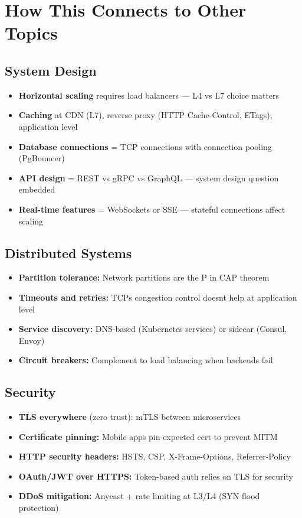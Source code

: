 \documentclass[11pt]{article}
\providecommand{\tightlist}{\setlength{\itemsep}{1pt}\setlength{\parskip}{0pt}}
\begin{document}
\section{How This Connects to Other Topics}\label{how-this-connects-to-other-topics}

\subsection{System Design}\label{system-design}

\begin{itemize}
\tightlist
\item
  \textbf{Horizontal scaling} requires load balancers --- L4 vs L7 choice matters
\item
  \textbf{Caching} at CDN (L7), reverse proxy (HTTP Cache-Control, ETags), application level
\item
  \textbf{Database connections} = TCP connections with connection pooling (PgBouncer)
\item
  \textbf{API design} = REST vs gRPC vs GraphQL --- system design question embedded
\item
  \textbf{Real-time features} = WebSockets or SSE --- stateful connections affect scaling
\end{itemize}

\subsection{Distributed Systems}\label{distributed-systems}

\begin{itemize}
\tightlist
\item
  \textbf{Partition tolerance:} Network partitions are the P in CAP theorem
\item
  \textbf{Timeouts and retries:} TCP\textquotesingle s congestion control doesn\textquotesingle t help at application level
\item
  \textbf{Service discovery:} DNS-based (Kubernetes services) or sidecar (Consul, Envoy)
\item
  \textbf{Circuit breakers:} Complement to load balancing when backends fail
\end{itemize}

\subsection{Security}\label{security}

\begin{itemize}
\tightlist
\item
  \textbf{TLS everywhere} (zero trust): mTLS between microservices
\item
  \textbf{Certificate pinning:} Mobile apps pin expected cert to prevent MITM
\item
  \textbf{HTTP security headers:} HSTS, CSP, X-Frame-Options, Referrer-Policy
\item
  \textbf{OAuth/JWT over HTTPS:} Token-based auth relies on TLS for security
\item
  \textbf{DDoS mitigation:} Anycast + rate limiting at L3/L4 (SYN flood protection)
\end{itemize}
\end{document}
